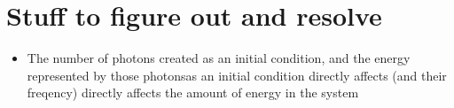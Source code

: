 \documentclass{article}
\begin{document}
\section{Stuff to figure out and resolve}

\begin{itemize}
 \item The number of photons created as an initial condition, and the energy represented by those photonsas an initial condition directly affects (and their
freqency) directly affects the amount of energy in the system
\end{itemize}




\end{document}
